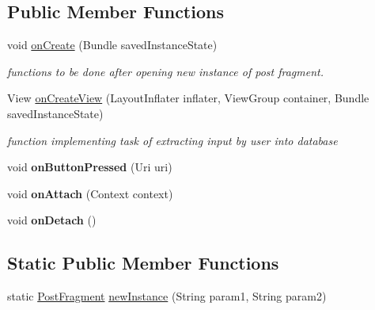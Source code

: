 \subsection*{Public Member Functions}
\begin{DoxyCompactItemize}
\item 
\hypertarget{classcom_1_1example_1_1sel_1_1lostfound_1_1PostFragment_a6ae53f1d4250edd39b3fab572b34a03c}{void \hyperlink{classcom_1_1example_1_1sel_1_1lostfound_1_1PostFragment_a6ae53f1d4250edd39b3fab572b34a03c}{on\-Create} (Bundle saved\-Instance\-State)}\label{classcom_1_1example_1_1sel_1_1lostfound_1_1PostFragment_a6ae53f1d4250edd39b3fab572b34a03c}

\begin{DoxyCompactList}\small\item\em functions to be done after opening new instance of post fragment. \end{DoxyCompactList}\item 
View \hyperlink{classcom_1_1example_1_1sel_1_1lostfound_1_1PostFragment_a8c10184073835d28affa07720db256a4}{on\-Create\-View} (Layout\-Inflater inflater, View\-Group container, Bundle saved\-Instance\-State)
\begin{DoxyCompactList}\small\item\em function implementing task of extracting input by user into database \end{DoxyCompactList}\item 
\hypertarget{classcom_1_1example_1_1sel_1_1lostfound_1_1PostFragment_afba287683734ca9acaea52278c3e1eb5}{void {\bfseries on\-Button\-Pressed} (Uri uri)}\label{classcom_1_1example_1_1sel_1_1lostfound_1_1PostFragment_afba287683734ca9acaea52278c3e1eb5}

\item 
\hypertarget{classcom_1_1example_1_1sel_1_1lostfound_1_1PostFragment_af8646c233bb3c70dbb6352f8a1c60e62}{void {\bfseries on\-Attach} (Context context)}\label{classcom_1_1example_1_1sel_1_1lostfound_1_1PostFragment_af8646c233bb3c70dbb6352f8a1c60e62}

\item 
\hypertarget{classcom_1_1example_1_1sel_1_1lostfound_1_1PostFragment_ae96f353335b113be26870d00d3ac3b1c}{void {\bfseries on\-Detach} ()}\label{classcom_1_1example_1_1sel_1_1lostfound_1_1PostFragment_ae96f353335b113be26870d00d3ac3b1c}

\end{DoxyCompactItemize}
\subsection*{Static Public Member Functions}
\begin{DoxyCompactItemize}
\item 
static \hyperlink{classcom_1_1example_1_1sel_1_1lostfound_1_1PostFragment}{Post\-Fragment} \hyperlink{classcom_1_1example_1_1sel_1_1lostfound_1_1PostFragment_a7350f5b81aa9144d9acdeca902676773}{new\-Instance} (String param1, String param2)
\end{DoxyCompactItemize}
